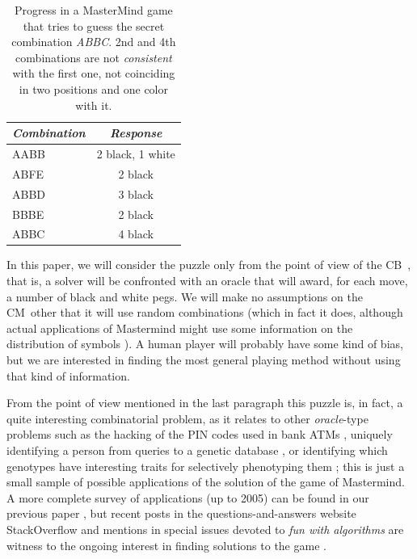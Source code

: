 \documentclass[preprint,12pt]{elsarticle}
\def\codemaker{CM}
\def\codebreaker{CB}
\begin{document}
%
\begin{table}[t]
\caption{Progress in a MasterMind game that tries to guess the secret
  combination {\em ABBC}. 2nd and 4th combinations are not {\em
    consistent} with the  
  first one, not coinciding in two positions and one color
  with it. \label{tab:mm}}
  \centering\smallskip
\begin{tabular}{|l|c|}
\hline
\emph{Combination} & \emph{Response} \\
\hline
AABB & 2 black, 1 white\\
ABFE & 2 black\\
ABBD & 3 black\\
BBBE & 2 black \\
ABBC & 4 black\\
\hline
\end{tabular}
\end{table}
%
In this paper, we will consider the puzzle only from the point of view
of the \codebreaker\ , that is, a solver will be confronted with an
oracle that will award, for each move, a number of black and white
pegs. We will make no assumptions on the \codemaker\ other that it
will use random combinations (which in fact it does, although actual
applications of Mastermind might use some information on the
distribution of symbols \cite{DBLP:journals/corr/abs-0904-4458}). A human player will probably have some
kind of bias, but we are interested in finding the most general
playing method
without using that kind of information. 

From the point of view mentioned in the last paragraph this puzzle is, in fact, a quite interesting combinatorial problem,
as it relates to other {\em oracle}-type problems such as the
 hacking of the PIN codes used in bank ATMs
 \cite{bank:mm,focardi2011guessing},  uniquely identifying a person
 from queries to a genetic database \cite{goodrich2009algorithmic,DBLP:journals/corr/abs-0904-4458}, or
 identifying which genotypes have interesting traits for selectively
 phenotyping them \cite{gagneur2011selective}; this is just a small
 sample of possible applications of the solution of the game of
 Mastermind. A more complete survey of applications (up to 2005) can
 be found in our previous paper \cite{mastermind05}, but recent posts
 in the questions-and-answers website StackOverflow and mentions in
 special issues devoted to {\em fun with algorithms}
 \cite{boldi2012special} are witness to the
 ongoing interest in finding solutions to the game
 \cite{stackoverflow}. 
\end{document}
